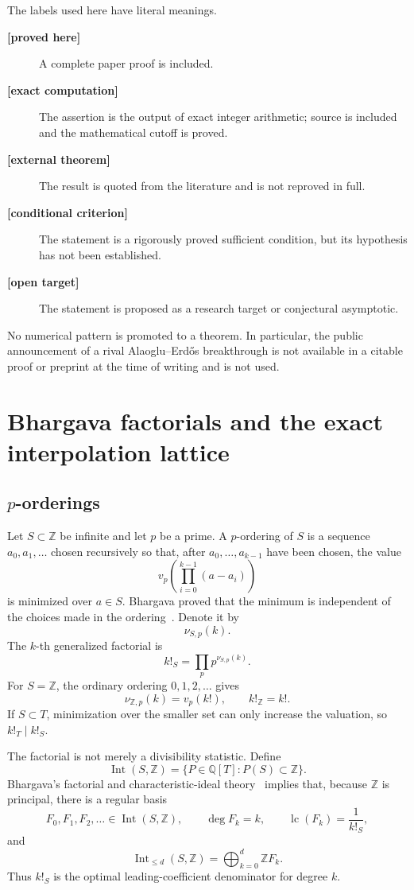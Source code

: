 \documentclass[11pt,oneside]{article}
\theoremstyle{definition}
\theoremstyle{remark}
\newcommand{\Z}{\mathbb Z}
\newcommand{\Q}{\mathbb Q}
\newcommand{\Int}{\operatorname{Int}}
\newcommand{\statusproved}{\textcolor{newgreen}{\textbf{[proved here]}}}
\newcommand{\statusexternal}{\textcolor{quietgray}{\textbf{[external theorem]}}}
\newcommand{\statuscomputed}{\textcolor{compviolet}{\textbf{[exact computation]}}}
\newcommand{\statusopen}{\textcolor{openorange}{\textbf{[open target]}}}
\newcommand{\statusconditional}{\textcolor{openorange}{\textbf{[conditional criterion]}}}
\begin{document}
The labels used here have literal meanings.
\begin{description}
\item[\statusproved] A complete paper proof is included.
\item[\statuscomputed] The assertion is the output of exact integer arithmetic; source is
included and the mathematical cutoff is proved.
\item[\statusexternal] The result is quoted from the literature and is not reproved in full.
\item[\statusconditional] The statement is a rigorously proved sufficient condition, but its
hypothesis has not been established.
\item[\statusopen] The statement is proposed as a research target or conjectural asymptotic.
\end{description}
No numerical pattern is promoted to a theorem.  In particular, the public announcement of a
rival Alaoglu--Erd\H{o}s breakthrough is not available in a citable proof or preprint at the
time of writing and is not used.

\section{Bhargava factorials and the exact interpolation lattice}
\label{sec:bhargava-basics}

\subsection{\(p\)-orderings}

Let \(S\subset\Z\) be infinite and let \(p\) be a prime.  A \(p\)-ordering of \(S\) is a
sequence \(a_0,a_1,\ldots\) chosen recursively so that, after \(a_0,\ldots,a_{k-1}\) have been
chosen, the value
\[
  v_p\!\left(\prod_{i=0}^{k-1}(a-a_i)\right)
\]
is minimized over \(a\in S\).  Bhargava proved that the minimum is independent of the choices
made in the ordering~\cite{Bhargava1997,Bhargava1998}.  Denote it by
\[
  \nu_{S,p}(k).
\]
The \(k\)-th generalized factorial is
\begin{equation}
  k!_S=\prod_p p^{\nu_{S,p}(k)}.
  \label{eq:generalized-factorial}
\end{equation}
For \(S=\Z\), the ordinary ordering \(0,1,2,\ldots\) gives
\[
  \nu_{\Z,p}(k)=v_p(k!),\qquad k!_{\Z}=k!.
\]
If \(S\subset T\), minimization over the smaller set can only increase the valuation, so
\(k!_T\mid k!_S\).

The factorial is not merely a divisibility statistic.  Define
\[
  \Int(S,\Z)=\{P\in\Q[T]:P(S)\subset\Z\}.
\]
Bhargava's factorial and characteristic-ideal theory~\cite{Bhargava1997,Bhargava2000,Bhargava2009,CahenChabert}
implies that, because \(\Z\) is principal, there is a regular basis
\[
  F_0,F_1,F_2,\ldots\in\Int(S,\Z),
  \qquad
  \deg F_k=k,
  \qquad
  \operatorname{lc}(F_k)=\frac{1}{k!_S},
  \label{eq:regular-basis}
\]
and
\[
  \Int_{\le d}(S,\Z)
  =\bigoplus_{k=0}^{d}\Z F_k.
  \label{eq:int-lattice}
\]
Thus \(k!_S\) is the optimal leading-coefficient denominator for degree \(k\).
\end{document}

